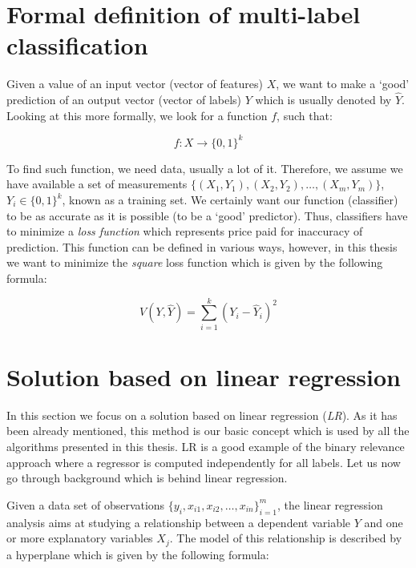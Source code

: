\section{Formal definition of multi-label classification}

Given a value of an input vector (vector of features) $X$, we want to make a `good' prediction of an output vector (vector of labels) $Y$ which is usually denoted by $\hat{Y}$. Looking at this more formally, we look for a function $f$, such that:   

\begin{equation}\label{eq:def}
    f: X \rightarrow \{0,1\}^k 
\end{equation}

To find such function, we need data, usually a lot of it. Therefore, we assume we have available a set of measurements $\{(X_1, Y_1), (X_2, Y_2), \ldots, (X_m, Y_m)\}$, $Y_i\in\{0,1\}^k$, known as a training set. We certainly want our function (classifier) to be as accurate as it is possible (to be a `good' predictor). Thus, classifiers have to minimize a \textit{loss function} which represents price paid for inaccuracy of prediction. This function can be defined in various ways, however, in this thesis we want to minimize the \textit{square} loss function which is given by the following formula:

\begin{equation}\label{eq:def}
    V(Y,\hat{Y})= \sum\limits_{i=1}^{k}(Y_{i}-\hat{Y}_{i})^2
\end{equation}


\section{Solution based on linear regression}\label{sec:lr}

In this section we focus on a solution based on linear regression (\textit{LR}). As it has been already mentioned, this method is our basic concept which is used by all the algorithms presented in this thesis. LR is a good example of the binary relevance approach where a regressor is computed independently for all labels. Let us now go through background which is behind linear regression. 

Given a data set of observations $\{y_i, x_{i1}, x_{i2}, \ldots, x_{in}\}_{i=1}^{m}$, the linear regression analysis aims at studying a relationship between a dependent variable $Y$ and one or more explanatory variables $X_{j}$. The model of this relationship is described by a hyperplane which is given by the following formula:

